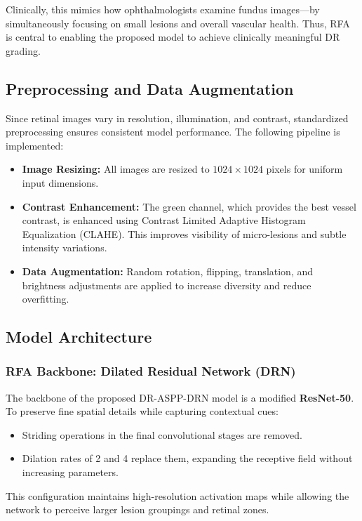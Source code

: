 \documentclass[12pt,a4paper]{article}
\begin{document}
Clinically, this mimics how ophthalmologists examine fundus images—by simultaneously focusing on small lesions and overall vascular health.  
Thus, RFA is central to enabling the proposed model to achieve clinically meaningful DR grading.

\subsection{Preprocessing and Data Augmentation}
Since retinal images vary in resolution, illumination, and contrast, standardized preprocessing ensures consistent model performance.  
The following pipeline is implemented:
\begin{itemize}
    \item \textbf{Image Resizing:} All images are resized to $1024 \times 1024$ pixels for uniform input dimensions.
    \item \textbf{Contrast Enhancement:} The green channel, which provides the best vessel contrast, is enhanced using Contrast Limited Adaptive Histogram Equalization (CLAHE).  
          This improves visibility of micro-lesions and subtle intensity variations.
    \item \textbf{Data Augmentation:} Random rotation, flipping, translation, and brightness adjustments are applied to increase diversity and reduce overfitting.
\end{itemize}

\subsection{Model Architecture}

\subsubsection{RFA Backbone: Dilated Residual Network (DRN)}
The backbone of the proposed DR-ASPP-DRN model is a modified \textbf{ResNet-50}.  
To preserve fine spatial details while capturing contextual cues:
\begin{itemize}[noitemsep, topsep=0pt]
    \item Striding operations in the final convolutional stages are removed.
    \item Dilation rates of 2 and 4 replace them, expanding the receptive field without increasing parameters.
\end{itemize}
This configuration maintains high-resolution activation maps while allowing the network to perceive larger lesion groupings and retinal zones.
\end{document}

